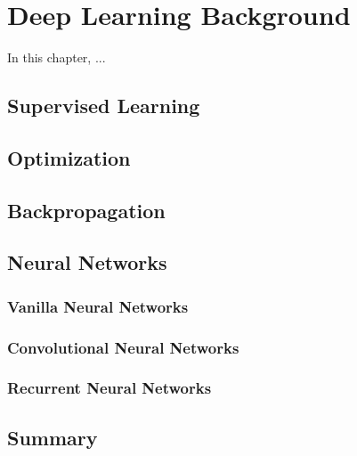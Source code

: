 \chapter{Deep Learning Background}
\label{chap-2-dl-background}
\begin{ChapAbstract}
In this chapter, ...
\end{ChapAbstract}

\section{Supervised Learning}
\section{Optimization}

\section{Backpropagation}

\section{Neural Networks}
\subsection{Vanilla Neural Networks}
\subsection{Convolutional Neural Networks}
\subsection{Recurrent Neural Networks}

\section{Summary}
